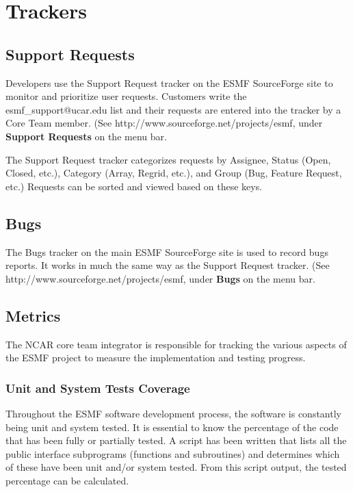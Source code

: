 
\section{Trackers}
\label{sec:tracking}

\subsection{Support Requests}
\label{sec:tracking_tools}

Developers use the Support Request tracker on the ESMF 
SourceForge site to monitor and prioritize user requests.
Customers write the esmf\_support@ucar.edu list and their
requests are entered into the tracker by a Core Team
member.  (See 
{http://www.sourceforge.net/projects/esmf}, under {\bf Support Requests}
on the menu bar.

The Support Request tracker categorizes requests by Assignee, 
Status (Open, Closed, etc.), Category (Array, Regrid, etc.), and
Group (Bug, Feature Request, etc.)  Requests can be sorted and
viewed based on these keys.

\subsection{Bugs}

The Bugs tracker on the main ESMF SourceForge site is used
to record bugs reports.  It works in much the same way as
the Support Request tracker.
(See 
{http://www.sourceforge.net/projects/esmf}, under {\bf Bugs}
on the menu bar.

\subsection{Metrics}

The NCAR core team integrator is responsible for tracking the
various aspects of the ESMF project to measure the implementation and
testing progress.
\subsubsection{Unit and System Tests Coverage}
Throughout the ESMF software development process, the software is constantly
being unit and system tested. It is essential to know the percentage of the
code that has been fully or partially tested. A script has been written that 
lists all the public interface subprograms (functions and subroutines) and 
determines which of these have been unit and/or system tested. From this script
output, the tested percentage can be calculated.
